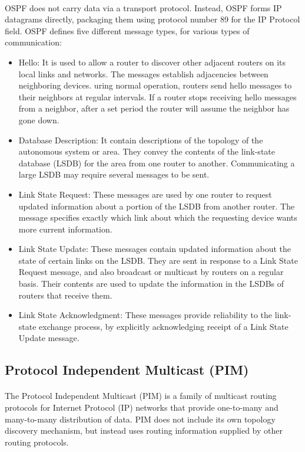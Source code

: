 \documentclass[12pt,a4paper]{report}
\begin{document}
\paragraph{}OSPF does not carry data via a transport protocol. Instead, OSPF forms IP datagrams directly, packaging them using protocol number 89 for the IP Protocol field. OSPF defines five different message types, for various types of communication:
\begin{itemize}
	\item Hello: It is used to allow a router to discover other adjacent routers on its local links and networks. The messages establish adjacencies between neighboring devices. uring normal operation, routers send hello messages to their neighbors at regular intervals. If a router stops receiving hello messages from a neighbor, after a set period the router will assume the neighbor has gone down.
	\item Database Description: It contain descriptions of the topology of the autonomous system or area.  They convey the contents of the link-state database (LSDB) for the area from one router to another. Communicating a large LSDB may require several messages to be sent.
	\item Link State Request: These messages are used by one router to request updated information about a portion of the LSDB from another router. The message specifies exactly which link about which the requesting device wants more current information.
	\item Link State Update: These messages contain updated information about the state of certain links on the LSDB. They are sent in response to a Link State Request message, and also broadcast or multicast by routers on a regular basis. Their contents are used to update the information in the LSDBs of routers that receive them.
	\item Link State Acknowledgment: These messages provide reliability to the link-state exchange process, by explicitly acknowledging receipt of a Link State Update message.
\end{itemize}

\subsection{Protocol Independent Multicast (PIM)}
\paragraph{}The Protocol Independent Multicast (PIM) is a family of multicast routing protocols for Internet Protocol (IP) networks that provide one-to-many and many-to-many distribution of data. PIM does not include its own topology discovery mechanism, but instead uses routing information supplied by other routing protocols.
\end{document}
